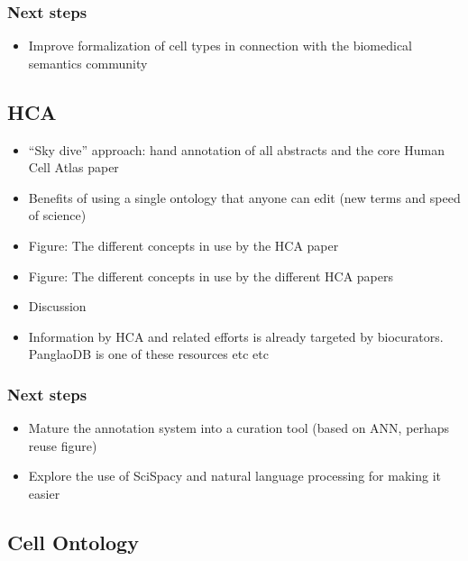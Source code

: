 \hypertarget{next-steps}{%
\subsubsection{Next steps}\label{next-steps}}

\begin{itemize}
\tightlist
\item
  Improve formalization of cell types in connection with the biomedical semantics community
\end{itemize}

\hypertarget{hca}{%
\subsection{HCA}\label{hca}}

\begin{itemize}
\tightlist
\item
  ``Sky dive'' approach: hand annotation of all abstracts and the core Human Cell Atlas paper
\item
  Benefits of using a single ontology that anyone can edit (new terms and speed of science)
\item
  Figure: The different concepts in use by the HCA paper
\item
  Figure: The different concepts in use by the different HCA papers
\item
  Discussion
\item
  Information by HCA and related efforts is already targeted by biocurators. PanglaoDB is one of
  these resources etc etc
\end{itemize}

\hypertarget{next-steps-1}{%
\subsubsection{Next steps}\label{next-steps-1}}

\begin{itemize}
\tightlist
\item
  Mature the annotation system into a curation tool (based on ANN, perhaps reuse figure)
\item
  Explore the use of SciSpacy and natural language processing for making it easier
\end{itemize}

\hypertarget{cell-ontology}{%
\subsection{Cell Ontology}\label{cell-ontology}}

